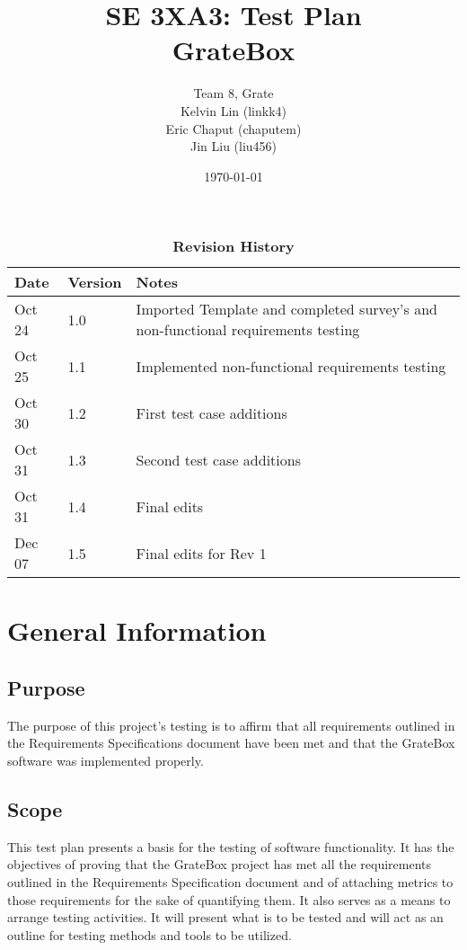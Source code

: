 \documentclass[12pt, titlepage]{article}
\title{SE 3XA3: Test Plan\\GrateBox}
\author{Team 8, Grate
		\\ Kelvin Lin (linkk4)
		\\ Eric Chaput (chaputem)
		\\ Jin Liu (liu456)
}
\date{\today}
\begin{document}
\maketitle

\tableofcontents
\listoftables
\listoffigures

\begin{table}[bph]
\caption{\bf Revision History}
\begin{tabularx}{\textwidth}{p{3cm}p{2cm}X}
\toprule {\bf Date} & {\bf Version} & {\bf Notes}\\
\midrule
Oct 24 & 1.0 & Imported Template and completed survey's and non-functional 
requirements  testing\\
Oct 25 & 1.1 & Implemented non-functional requirements testing\\
Oct 30 & 1.2 & First test case additions\\
Oct 31 & 1.3 & Second test case additions\\
Oct 31 & 1.4 & Final edits\\
Dec 07 & 1.5 & Final edits for Rev 1\\
\bottomrule
\end{tabularx}
\end{table}

\newpage


\section{General Information}

\subsection{Purpose}

The purpose of this project's testing is to affirm that all requirements 
outlined in the Requirements Specifications document have been met and that the 
GrateBox software was implemented properly.

\subsection{Scope}

This test plan presents a basis for the testing of software functionality. It 
has the objectives of proving that the GrateBox project has met all the 
requirements outlined in the Requirements Specification document and of 
attaching metrics to those requirements for the sake of quantifying them. It 
also serves as a means to arrange testing activities. It will present what is to 
be tested and will act as an outline for testing methods and tools to be 
utilized.
\end{document}
